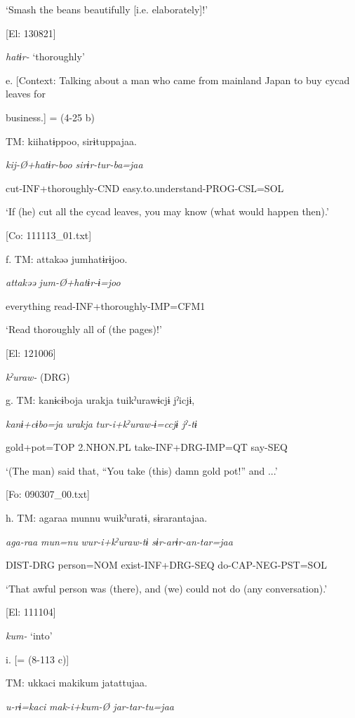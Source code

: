       ‘Smash the beans beautifully [i.e. elaborately]!’

      [El: 130821]

  \textit{hatɨr-} ‘thoroughly’

  e.  [Context: Talking about a man who came from mainland Japan to buy cycad leaves for

business.] = (4-25 b)

    TM:  kiihatɨppoo,  sirɨtuppajaa.

      \textit{kij-Ø+hatɨr{}-boo  sirɨr-tur-ba=jaa}

      cut-INF+thoroughly-CND  easy.to.understand-PROG-CSL=SOL

      ‘If (he) cut all the cycad leaves, you may know (what would happen then).’

      [Co: 111113\_01.txt]

  f.  TM:  attakəə  jumhatɨrɨjoo.

      \textit{attakəə}  \textit{jum-Ø+hatɨr{}-ɨ=joo}

      everything  read-INF+thoroughly-IMP=CFM1

      ‘Read thoroughly all of (the pages)!’

      [El: 121006]

  \textit{kˀuraw-} (DRG)

  g.  TM:  kanɨcɨboja  urakja  tuikˀurawɨcjɨ  jˀicjɨ,

      \textit{kanɨ+cɨbo=ja}  \textit{urakja}  \textit{tur-i+kˀuraw{}-ɨ=ccjɨ  jˀ-tɨ}

      gold+pot=TOP  2.NHON.PL  take-INF+DRG-IMP=QT  say-SEQ

      ‘(The man) said that, “You take (this) damn gold pot!” and ...’

      [Fo: 090307\_00.txt]

  h.  TM:  agaraa  munnu  wuikˀuratɨ,  sɨrarantajaa.

      \textit{aga-raa}  \textit{mun=nu}  \textit{wur-i+kˀuraw{}-tɨ  sɨr-arɨr-an-tar=jaa}

      DIST-DRG  person=NOM  exist-INF+DRG-SEQ  do-CAP-NEG-PST=SOL

      ‘That awful person was (there), and (we) could not do (any conversation).’

      [El: 111104]

  \textit{kum-} ‘into’

  i.  [= (8-113 c)]

    TM:  ukkaci  makikum  jatattujaa.

      \textit{u-rɨ=kaci}  \textit{mak-i+kum{}-Ø  jar-tar-tu=jaa}

